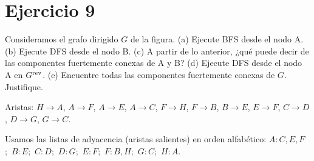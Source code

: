 \section{Ejercicio 9}
\begin{enunciado}
Consideramos el grafo dirigido $G$ de la figura.
(a) Ejecute BFS desde el nodo A.
(b) Ejecute DFS desde el nodo B.
(c) A partir de lo anterior, ¿qué puede decir de las componentes fuertemente conexas de A y B?
(d) Ejecute DFS desde el nodo A en $G^{\mathrm{rev}}$.
(e) Encuentre todas las componentes fuertemente conexas de $G$. Justifique.
\end{enunciado}

\begin{center}

\small Aristas: $H\!\to\!A$, $A\!\to\!F$, $A\!\to\!E$, $A\!\to\!C$, $F\!\to\!H$, $F\!\to\!B$,
$B\!\to\!E$, $E\!\to\!F$, $C\!\to\!D$, $D\!\to\!G$, $G\!\to\!C$.
\end{center}
Usamos las listas de adyacencia (aristas salientes) en orden alfabético:
$A\!:\!C,E,F$;\ $B\!:\!E$;\ $C\!:\!D$;\ $D\!:\!G$;\ $E\!:\!F$;\ $F\!:\!B,H$;\ $G\!:\!C$;\ $H\!:\!A$.

